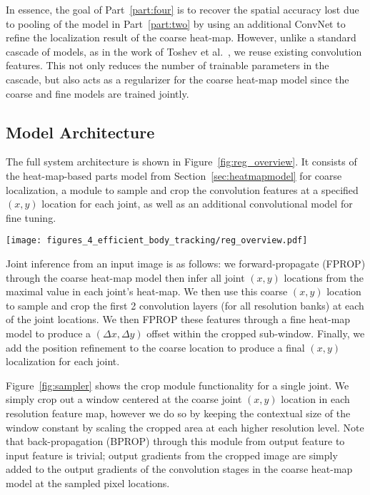 In essence, the goal of Part~\ref{part:four} is to recover the spatial accuracy lost due to pooling of the model in Part~\ref{part:two} by using an additional ConvNet to refine the localization result of the coarse heat-map. However, unlike a standard cascade of models, as in the work of Toshev et al.~\cite{deeppose}, we reuse existing convolution features. This not only reduces the number of trainable parameters in the cascade, but also acts as a regularizer for the coarse heat-map model since the coarse and fine models are trained jointly.

\subsection{Model Architecture}

The full system architecture is shown in Figure~\ref{fig:reg_overview}. It consists of the heat-map-based parts model from Section~\ref{sec:heatmapmodel} for coarse localization, a module to sample and crop the convolution features at a specified $(x,y)$ location for each joint, as well as an additional convolutional model for fine tuning.

\begin{figure*}[ht]
\centering
\texttt{[image: figures\_4\_efficient\_body\_tracking/reg\_overview.pdf]}
   \caption{Overview of our Cascaded Architecture}
\label{fig:reg_overview}
\end{figure*}

Joint inference from an input image is as follows: we forward-propagate (FPROP) through the coarse heat-map model then infer all joint $(x,y)$ locations from the maximal value in each joint's heat-map. We then use this coarse $(x,y)$ location to sample and crop the first 2 convolution layers (for all resolution banks) at each of the joint locations. We then FPROP these features through a fine heat-map model to produce a $(\Delta x,\Delta y)$ offset within the cropped sub-window. Finally, we add the position refinement to the coarse location to produce a final $(x,y)$ localization for each joint.

Figure~\ref{fig:sampler} shows the crop module functionality for a single joint. We simply crop out a window centered at the coarse joint $(x,y)$ location in each resolution feature map, however we do so by keeping the contextual size of the window constant by scaling the cropped area at each higher resolution level. Note that back-propagation (BPROP) through this module from output feature to input feature is trivial; output gradients from the cropped image are simply added to the output gradients of the convolution stages in the coarse heat-map model at the sampled pixel locations.

